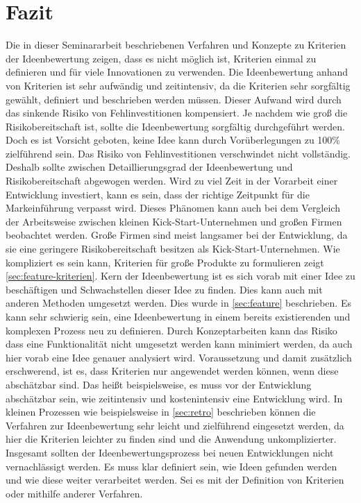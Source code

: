 \section{Fazit}\label{sec:fazit}
Die in dieser Seminararbeit beschriebenen Verfahren und Konzepte zu Kriterien der Ideenbewertung zeigen, dass
es nicht möglich ist, Kriterien einmal zu definieren und für viele Innovationen zu verwenden. Die Ideenbewertung anhand 
von Kriterien ist sehr aufwändig und zeitintensiv, da die Kriterien sehr sorgfältig gewählt, definiert und beschrieben 
werden müssen. Dieser Aufwand wird durch das sinkende Risiko von Fehlinvestitionen kompensiert. 
Je nachdem wie groß die Risikobereitschaft ist, sollte die Ideenbewertung sorgfältig durchgeführt werden. 
Doch es ist Vorsicht geboten, keine Idee kann durch Vorüberlegungen zu 100\% zielführend sein. Das Risiko von 
Fehlinvestitionen verschwindet nicht vollständig. Deshalb sollte zwischen Detaillierungsgrad der Ideenbewertung 
und Risikobereitschaft abgewogen werden. Wird zu viel Zeit in der Vorarbeit einer Entwicklung investiert, kann es sein, dass
der richtige Zeitpunkt für die Markeinführung verpasst wird.  Dieses Phänomen kann auch bei dem Vergleich der Arbeitsweise zwischen kleinen 
Kick-Start-Unternehmen und großen Firmen beobachtet werden. Große Firmen sind meist langsamer bei der Entwicklung, da sie eine 
geringere Risikobereitschaft besitzen als Kick-Start-Unternehmen. Wie kompliziert es sein kann, Kriterien für große Produkte zu formulieren 
zeigt \autoref{sec:feature-kriterien}.
Kern der Ideenbewertung ist es sich vorab mit einer Idee zu beschäftigen und Schwachstellen dieser Idee zu finden. Dies 
kann auch mit anderen Methoden umgesetzt werden. Dies wurde in \autoref{sec:feature} beschrieben. Es kann sehr schwierig sein, 
eine Ideenbewertung in einem bereits existierenden und komplexen Prozess neu zu definieren. Durch Konzeptarbeiten kann 
das Risiko dass eine Funktionalität nicht umgesetzt werden kann minimiert werden, da auch hier vorab eine Idee genauer 
analysiert wird. 
Voraussetzung und damit zusätzlich erschwerend, ist es, dass Kriterien nur angewendet werden können, wenn diese abschätzbar sind. 
Das heißt beispielsweise, es muss vor der Entwicklung abschätzbar sein, wie zeitintensiv und kostenintensiv eine Entwicklung wird. 
In kleinen Prozessen wie beispielsweise in \autoref{sec:retro} beschrieben können die Verfahren zur Ideenbewertung sehr leicht und 
zielführend eingesetzt werden, da hier die Kriterien leichter zu finden sind und die Anwendung unkomplizierter. 
Insgesamt sollten der Ideenbewertungsprozess bei neuen Entwicklungen nicht vernachlässigt werden. Es muss klar definiert sein, wie
Ideen gefunden werden und wie diese weiter verarbeitet werden. Sei es mit der Definition von Kriterien oder mithilfe anderer Verfahren. 